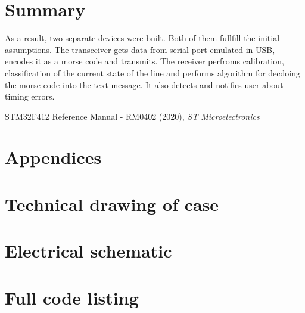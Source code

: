 \documentclass[12pt]{article}
\begin{document}
	\section{Summary}
  As a result, two separate devices were built. Both of them fullfill the initial assumptions.
  The transceiver gets data from serial port emulated in USB, encodes it as a morse code and transmits.
  The receiver perfroms calibration, classification of the current state of the line and performs algorithm for decdoing the morse code into the text message. It also detects and notifies user about timing errors.
	
	\begin{thebibliography}{9}
     STM32F412 Reference Manual - RM0402 (2020), \emph{ST Microelectronics}
	\end{thebibliography}
	

  \section*{Appendices}
	\appendix
	\section{Technical drawing of case}
	\section{Electrical schematic}
	\section{Full code listing}
	
\end{document}
